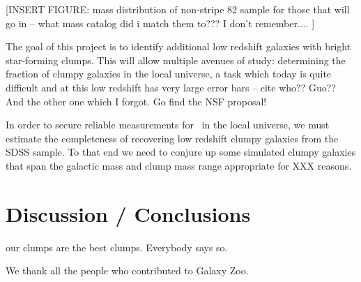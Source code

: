 [INSERT FIGURE: mass distribution of non-stripe 82 sample for those that will go in -- what mass catalog did i match them to??? I don't remember.... ]



The goal of this project is to identify additional low redshift galaxies with bright star-forming clumps. This will allow multiple avenues of study: determining the fraction of clumpy galaxies in the local universe, a task which today is quite difficult and at this low redshift has very large error bars -- cite who?? Guo?? And the other one which I forgot. Go find the NSF proposal!

In order to secure reliable measurements for \fclump~in the local universe, we must estimate the completeness of recovering low redshift clumpy galaxies from the SDSS sample. To that end we need to conjure up some simulated clumpy galaxies that span the galactic mass and clump mass range appropriate for XXX reasons. 


\section{Discussion / Conclusions}
our clumps are the best clumps. Everybody says so. 


We thank all the people who contributed to Galaxy Zoo. 